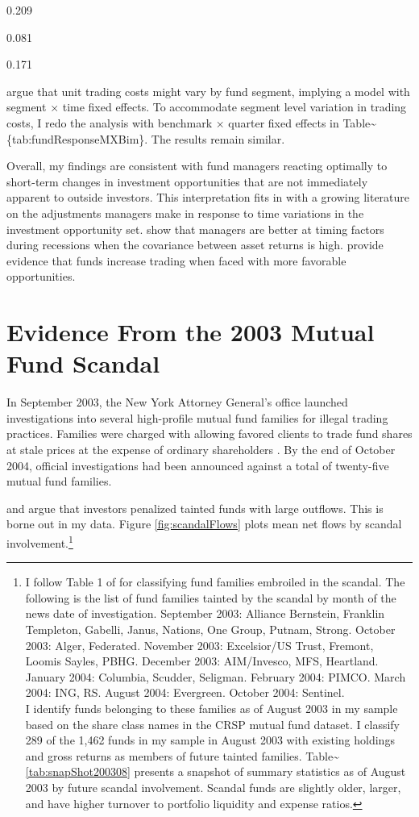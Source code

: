\documentclass[]{book}
\let\rmarkdownfootnote\footnote%
\def\footnote{\protect\rmarkdownfootnote}
\theoremstyle{definition}
\theoremstyle{definition}
\theoremstyle{definition}
\theoremstyle{remark}
\begin{document}
0.209

0.081

0.171

\citet{pst17L} argue that unit trading costs might vary by fund segment,
implying a model with segment \(\times\) time fixed effects. To
accommodate segment level variation in trading costs, I redo the
analysis with benchmark \(\times\) quarter fixed effects in
Table\textasciitilde{}\{tab:fundResponseMXBim\}. The results remain
similar.

Overall, my findings are consistent with fund managers reacting
optimally to short-term changes in investment opportunities that are not
immediately apparent to outside investors. This interpretation fits in
with a growing literature on the adjustments managers make in response
to time variations in the investment opportunity set. \citet{knv16} show
that managers are better at timing factors during recessions when the
covariance between asset returns is high. \citet{pst17} provide evidence
that funds increase trading when faced with more favorable
opportunities.

\hypertarget{sec:scandal}{%
\chapter{Evidence From the 2003 Mutual Fund Scandal}\label{sec:scandal}}

In September 2003, the New York Attorney General's office launched
investigations into several high-profile mutual fund families for
illegal trading practices. Families were charged with allowing favored
clients to trade fund shares at stale prices at the expense of ordinary
shareholders \citep{hw05, zitzewitz06}. By the end of October 2004,
official investigations had been announced against a total of
twenty-five mutual fund families.

\citet{hw05} and \citet{mccabe08} argue that investors penalized tainted
funds with large outflows. This is borne out in my data. Figure
\ref{fig:scandalFlows} plots mean net flows by scandal
involvement.\footnote{I follow Table 1 of \citet{hw05} for classifying
  fund families embroiled in the scandal. The following is the list of
  fund families tainted by the scandal by month of the news date of
  investigation. September 2003: Alliance Bernstein, Franklin Templeton,
  Gabelli, Janus, Nations, One Group, Putnam, Strong. October 2003:
  Alger, Federated. November 2003: Excelsior/US Trust, Fremont, Loomis
  Sayles, PBHG. December 2003: AIM/Invesco, MFS, Heartland. January
  2004: Columbia, Scudder, Seligman. February 2004: PIMCO. March 2004:
  ING, RS. August 2004: Evergreen. October 2004: Sentinel.\\
  I identify funds belonging to these families as of August 2003 in my
  sample based on the share class names in the CRSP mutual fund dataset.
  I classify 289 of the 1,462 funds in my sample in August 2003 with
  existing holdings and gross returns as members of future tainted
  families. Table\textasciitilde{}\ref{tab:snapShot200308} presents a
  snapshot of summary statistics as of August 2003 by future scandal
  involvement. Scandal funds are slightly older, larger, and have higher
  turnover to portfolio liquidity and expense ratios.}
\end{document}
